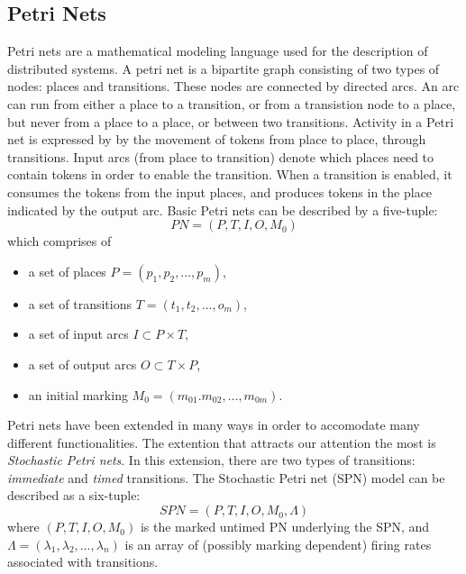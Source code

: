\documentclass[11pt]{book}
\begin{document}
\subsection{Petri Nets}
Petri nets are a mathematical modeling language used for the description of distributed systems. A petri net is a bipartite graph consisting of two types of nodes: places and transitions. These nodes are connected by directed arcs. An arc can run from either a place to a transition, or from a transistion node to a place, but never from a place to a place, or between two transitions. Activity in a Petri net is expressed by by the movement of tokens from place to place, through transitions. Input arcs (from place to transition) denote which places need to contain tokens in order to enable the transition. When a transition is enabled, it consumes the tokens from the input places, and produces tokens in the place indicated by the output arc.
Basic Petri nets can be described by a five-tuple:
\begin{equation}
PN = (P,T,I,O,M_0)
\end{equation}
which comprises of
\begin{itemize}
\item a set of places $P = (p_1, p_2, ..., p_m)$,
\item a set of transitions $T = (t_1, t_2, ...,o_m)$,
\item a set of input arcs $I \subset P \times T$,
\item a set of output arcs $O \subset T \times P$,
\item an initial marking $M_0 = (m_{01}. m_{02}, \ldots, m_{0m})$.

\end{itemize}

Petri nets have been extended in many ways in order to accomodate many different functionalities. The extention that attracts our attention the most is \emph{Stochastic Petri nets}. In this extension, there are two types of transitions: \emph{immediate} and \emph{timed} transitions.
The Stochastic Petri net (SPN) model can be described as a six-tuple:
\begin{equation}
SPN = (P,T,I,O,M_0,\Lambda)
\end{equation}
where $(P,T,I,O,M_0)$ is the marked untimed PN underlying the SPN, and $\Lambda = (\lambda_1, \lambda_2, \ldots, \lambda_n)$ is an array of (possibly marking dependent) firing rates associated with transitions.
\end{document}
